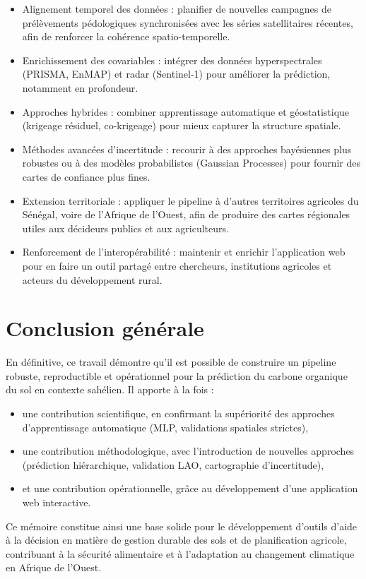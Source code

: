 \documentclass[12pt,a4paper,oneside]{report}
\begin{document}
\begin{itemize}
  \item Alignement temporel des données : planifier de nouvelles campagnes de prélèvements pédologiques synchronisées avec les séries satellitaires récentes, afin de renforcer la cohérence spatio-temporelle.

  \item Enrichissement des covariables : intégrer des données hyperspectrales (PRISMA, EnMAP) et radar (Sentinel-1) pour améliorer la prédiction, notamment en profondeur.

  \item Approches hybrides : combiner apprentissage automatique et géostatistique (krigeage résiduel, co-krigeage) pour mieux capturer la structure spatiale.

  \item Méthodes avancées d’incertitude : recourir à des approches bayésiennes plus robustes ou à des modèles probabilistes (Gaussian Processes) pour fournir des cartes de confiance plus fines.

  \item Extension territoriale : appliquer le pipeline à d’autres territoires agricoles du Sénégal, voire de l’Afrique de l’Ouest, afin de produire des cartes régionales utiles aux décideurs publics et aux agriculteurs.

  \item Renforcement de l’interopérabilité : maintenir et enrichir l’application web pour en faire un outil partagé entre chercheurs, institutions agricoles et acteurs du développement rural.
\end{itemize}
\section{Conclusion générale}

En définitive, ce travail démontre qu’il est possible de construire un pipeline robuste, reproductible et opérationnel pour la prédiction du carbone organique du sol en contexte sahélien.
Il apporte à la fois :
\begin{itemize}
  \item une contribution scientifique, en confirmant la supériorité des approches d’apprentissage automatique (MLP, validations spatiales strictes),

  \item une contribution méthodologique, avec l’introduction de nouvelles approches (prédiction hiérarchique, validation LAO, cartographie d’incertitude),

  \item et une contribution opérationnelle, grâce au développement d’une application web interactive.

\end{itemize} 
Ce mémoire constitue ainsi une base solide pour le développement d’outils d’aide à la décision en matière de gestion durable des sols et de planification agricole, contribuant à la sécurité alimentaire et à l’adaptation au changement climatique en Afrique de l’Ouest.
\end{document}
